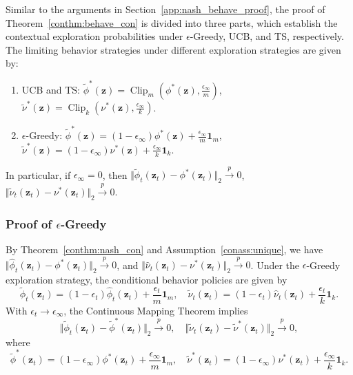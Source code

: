 \documentclass[12pt]{article}
\begin{document}
Similar to the arguments in Section~\ref{app:nash_behave_proof}, the proof of Theorem~\ref{conthm:behave_con} is divided into three parts, which establish the contextual exploration probabilities under $\epsilon$-Greedy, UCB, and TS, respectively.
The limiting behavior strategies under different exploration
strategies are given by:
\begin{enumerate}
    \item[\textnormal{(1)}] UCB and TS:
    $\widetilde{\phi}^{\ast}(\bm z) =
    \operatorname{Clip}_{m}
    \left(
    \phi^\ast(\bm z),
    \frac{\epsilon_\infty}{m}
    \right)$,
    $\widetilde{\nu}^{\ast}(\bm z) =
    \operatorname{Clip}_{k}
    \left(
    \nu^\ast(\bm z),
    \frac{\epsilon_\infty}{k}
    \right)$.
    \item[\textnormal{(2)}] $\epsilon$-Greedy:
    $\widetilde{\phi}^{\ast}(\bm z) =
    (1-\epsilon_\infty)\phi^\ast(\bm z)
    + \frac{\epsilon_\infty}{m}\bm 1_m$,
    $\widetilde{\nu}^{\ast}(\bm z) =
    (1-\epsilon_\infty)\nu^\ast(\bm z)
    + \frac{\epsilon_\infty}{k}\bm 1_k$.
\end{enumerate}
In particular, if $\epsilon_\infty=0$, then 
$\Vert
\widetilde{\phi}_t(\bm z_t) -
\phi^\ast(\bm z_t)
\Vert_2
\stackrel{p}{\to}
0$,
$\Vert
\widetilde{\nu}_t(\bm z_t) -
\nu^\ast(\bm z_t)
\Vert_2
\stackrel{p}{\to}
0$.

\subsubsection{Proof of $\epsilon$-Greedy}
By Theorem~\ref{conthm:nash_con} and Assumption~\ref{conass:unique}, we have $\Vert \widehat{\phi}_t(\bm z_t) - \phi^\ast(\bm z_t) \Vert_2 \stackrel{p}{\to} 0$, and $\Vert \widehat{\nu}_t(\bm z_t) - \nu^\ast(\bm z_t) \Vert_2 \stackrel{p}{\to} 0$.
Under the $\epsilon$-Greedy exploration strategy, the conditional behavior
policies are given by
\[
\widetilde{\phi}_t(\bm z_t)
=
(1-\epsilon_t)\widehat{\phi}_t(\bm z_t)
+
\frac{\epsilon_t}{m}\mathbf 1_m,
\quad
\widetilde{\nu}_t(\bm z_t)
=
(1-\epsilon_t)\widehat{\nu}_t(\bm z_t)
+
\frac{\epsilon_t}{k}\mathbf 1_k.
\]
With $\epsilon_t\to\epsilon_\infty$, the Continuous Mapping Theorem implies
\[
\Vert
\widetilde{\phi}_t(\bm z_t) -
\widetilde{\phi}^{\ast}(\bm z_t)
\Vert_2
\stackrel{p}{\to} 0,
\quad
\Vert
\widetilde{\nu}_t(\bm z_t) -
\widetilde{\nu}^{\ast}(\bm z_t)
\Vert_2
\stackrel{p}{\to} 0,
\]
where
\[
\widetilde{\phi}^{\ast}(\bm z_t)
=
(1-\epsilon_\infty)\phi^\ast(\bm z_t)
+
\frac{\epsilon_\infty}{m}\mathbf 1_m,
\quad
\widetilde{\nu}^{\ast}(\bm z_t)
=
(1-\epsilon_\infty)\nu^\ast(\bm z_t)
+
\frac{\epsilon_\infty}{k}\mathbf 1_k.
\]
\end{document}
